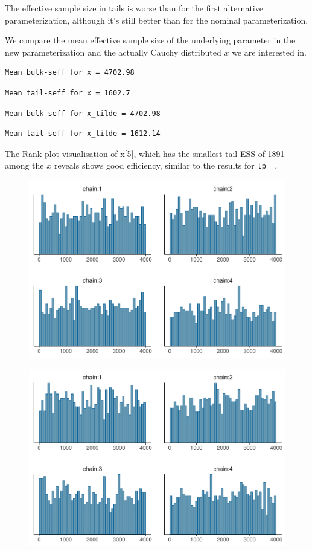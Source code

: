 \documentclass[american,]{article}
\begin{document}
The effective sample size in tails is worse than for the first
alternative parameterization, although it's still better than for the
nominal parameterization.

We compare the mean effective sample size of the underlying parameter in
the new parameterization and the actually Cauchy distributed \(x\) we
are interested in.

\begin{verbatim}
Mean bulk-seff for x = 4702.98
\end{verbatim}

\begin{verbatim}
Mean tail-seff for x = 1602.7
\end{verbatim}

\begin{verbatim}
Mean bulk-seff for x_tilde = 4702.98
\end{verbatim}

\begin{verbatim}
Mean tail-seff for x_tilde = 1612.14
\end{verbatim}

The Rank plot visualisation of x{[}5{]}, which has the smallest tail-ESS
of 1891 among the \(x\) reveals shows good efficiency, similar to the
results for \texttt{lp\_\_}.

\begin{figure}[tp]
  \centering
  \includegraphics[width=0.6\linewidth]{graphics/hist-fit-alt3-1.pdf}
\end{figure}

\begin{figure}[tp]
  \centering
  \includegraphics[width=0.6\linewidth]{graphics/hist-fit-alt3-lp-1.pdf}
\end{figure}
\end{document}
